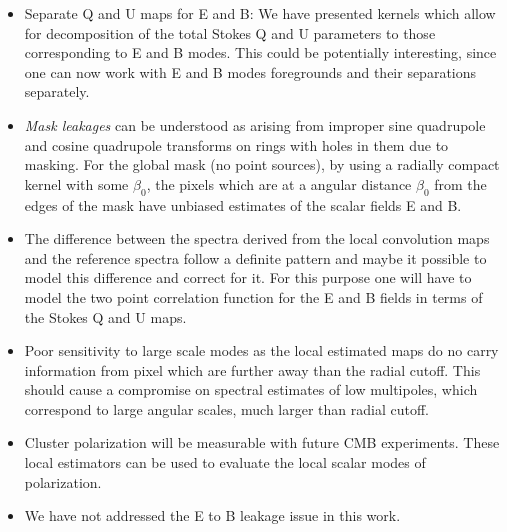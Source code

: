 \begin{itemize}
\item{Separate Q and U maps for E and B:} We have presented kernels which allow for decomposition of the total Stokes Q and U parameters to those corresponding to E and B modes. This could be potentially interesting, since one can now work with E and B modes foregrounds and their separations separately. 

\item \textit{Mask leakages} can be understood as arising from improper sine quadrupole and cosine quadrupole transforms on rings with holes in them due to masking. For the global mask (no point sources), by using a radially compact kernel with some $\beta_0$, the pixels which are at a angular distance $\beta_0$ from the edges of the mask have unbiased estimates of the scalar fields E and B.

\item{The difference between the spectra derived from the local convolution maps and the reference spectra follow a definite pattern and maybe it possible to model this difference and correct for it. For this purpose one will have to model the two point correlation function for the E and B fields in terms of the Stokes Q and U maps.}

\item{Poor sensitivity to large scale modes as the local estimated maps do no carry information from pixel which are further away than the radial cutoff. This should cause a compromise on spectral estimates of low multipoles, which correspond to large angular scales, much larger than radial cutoff.}
\item{Cluster polarization will be measurable with future CMB experiments. These local estimators can be used to evaluate the local scalar modes of polarization.}

\item{We have not addressed the E to B leakage issue in this work.}


\end{itemize}
%
